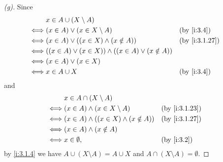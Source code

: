\begin{proof}[(g)]
  Since
  \begin{align*}
         & x \in A \cup (X \setminus A)                                                      \\
    \iff & (x \in A) \lor (x \in X \setminus A)                           &  & \by{i:3.4}    \\
    \iff & (x \in A) \lor ((x \in X) \land (x \notin A))                  &  & \by{i:3.1.27} \\
    \iff & ((x \in A) \lor (x \in X)) \land ((x \in A) \lor (x \notin A))                    \\
    \iff & (x \in A) \lor (x \in X)                                                          \\
    \iff & x \in A \cup X                                                 &  & \by{i:3.4}
  \end{align*}
  and
  \begin{align*}
         & x \in A \cap (X \setminus A)                                      \\
    \iff & (x \in A) \land (x \in X \setminus A)          &  & \by{i:3.1.23} \\
    \iff & (x \in A) \land ((x \in X) \land (x \notin A)) &  & \by{i:3.1.27} \\
    \iff & (x \in A) \land (x \notin A)                                      \\
    \iff & x \in \emptyset,                               &  & \by{i:3.2}
  \end{align*}
  by \cref{i:3.1.4} we have \(A \cup (X \setminus A) = A \cup X\) and \(A \cap (X \setminus A) = \emptyset\).
\end{proof}

